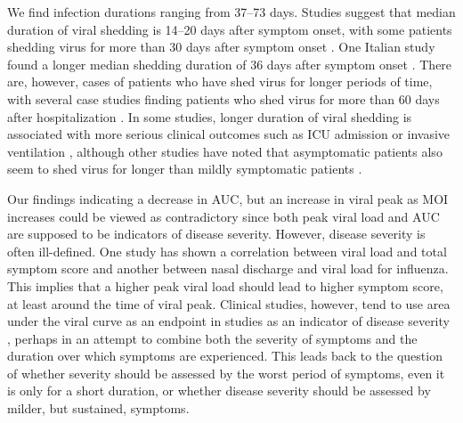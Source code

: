 We find infection durations ranging from 37--73 days. Studies suggest that median duration of viral shedding is 14--20 days after symptom onset, with some patients shedding virus for more than 30 days after symptom onset \citep{qi20, he20shed, zhou20, lee20}. One Italian study found a longer median shedding duration of 36 days after symptom onset \citep{mancuso20}. There are, however, cases of patients who have shed virus for longer periods of time, with several case studies finding patients who shed virus for more than 60 days after hospitalization \citep{park20, liu20, li20shed}. In some studies, longer duration of viral shedding is associated with more serious clinical outcomes such as ICU admission or invasive ventilation \citep{zeng20, lee20}, although other studies have noted that asymptomatic patients also seem to shed virus for longer than mildly symptomatic patients \citep{long20}.

Our findings indicating a decrease in AUC, but an increase in viral peak as MOI increases could be viewed as contradictory since both peak viral load and AUC are supposed to be indicators of disease severity. However, disease severity is often ill-defined. One study has shown a correlation between viral load and total symptom score \citep{chen12} and another between nasal discharge and viral load \citep{handel15} for influenza. This implies that a higher peak viral load should lead to higher symptom score, at least around the time of viral peak. Clinical studies, however, tend to use area under the viral curve as an endpoint in studies as an indicator of disease severity \citep{devincenzo20, hershberger19, stevens18, devincenzo15}, perhaps in an attempt to combine both the severity of symptoms and the duration over which symptoms are experienced. This leads back to the question of whether severity should be assessed by the worst period of symptoms, even it is only for a short duration, or whether disease severity should be assessed by milder, but sustained, symptoms.

